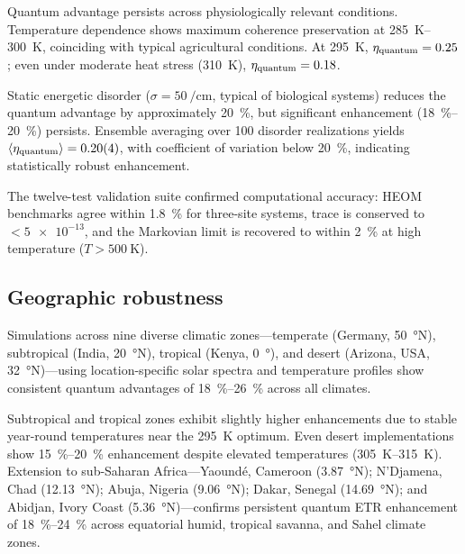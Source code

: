 Quantum advantage persists across physiologically relevant conditions. Temperature dependence shows maximum coherence preservation at \SIrange{285}{300}{\kelvin}, coinciding with typical agricultural conditions. At \SI{295}{\kelvin}, $\eta_{\rm quantum} = \num{0.25}$; even under moderate heat stress (\SI{310}{\kelvin}), $\eta_{\rm quantum} = \num{0.18}$.

Static energetic disorder ($\sigma = \SI{50}{\per\centi\meter}$, typical of biological systems) reduces the quantum advantage by approximately \SI{20}{\percent}, but significant enhancement (\SIrange{18}{20}{\percent}) persists. Ensemble averaging over \num{100} disorder realizations yields $\langle\eta_{\rm quantum}\rangle = \num{0.20(4)}$, with coefficient of variation below \SI{20}{\percent}, indicating statistically robust enhancement.

The twelve-test validation suite confirmed computational accuracy: HEOM benchmarks agree within \SI{1.8}{\percent} for three-site systems, trace is conserved to $<\num{5e-13}$, and the Markovian limit is recovered to within \SI{2}{\percent} at high temperature ($T > \SI{500}{\kelvin}$).

\subsection{Geographic robustness}

Simulations across nine diverse climatic zones---temperate (Germany, \SI{50}{\degree}N), subtropical (India, \SI{20}{\degree}N), tropical (Kenya, \SI{0}{\degree}), and desert (Arizona, USA, \SI{32}{\degree}N)---using location-specific solar spectra and temperature profiles show consistent quantum advantages of \SIrange{18}{26}{\percent} across all climates.

Subtropical and tropical zones exhibit slightly higher enhancements due to stable year-round temperatures near the \SI{295}{\kelvin} optimum. Even desert implementations show \SIrange{15}{20}{\percent} enhancement despite elevated temperatures (\SIrange{305}{315}{\kelvin}). Extension to sub-Saharan Africa---Yaound\'e, Cameroon (\SI{3.87}{\degree}N); N'Djamena, Chad (\SI{12.13}{\degree}N); Abuja, Nigeria (\SI{9.06}{\degree}N); Dakar, Senegal (\SI{14.69}{\degree}N); and Abidjan, Ivory Coast (\SI{5.36}{\degree}N)---confirms persistent quantum ETR enhancement of \SIrange{18}{24}{\percent} across equatorial humid, tropical savanna, and Sahel climate zones.

